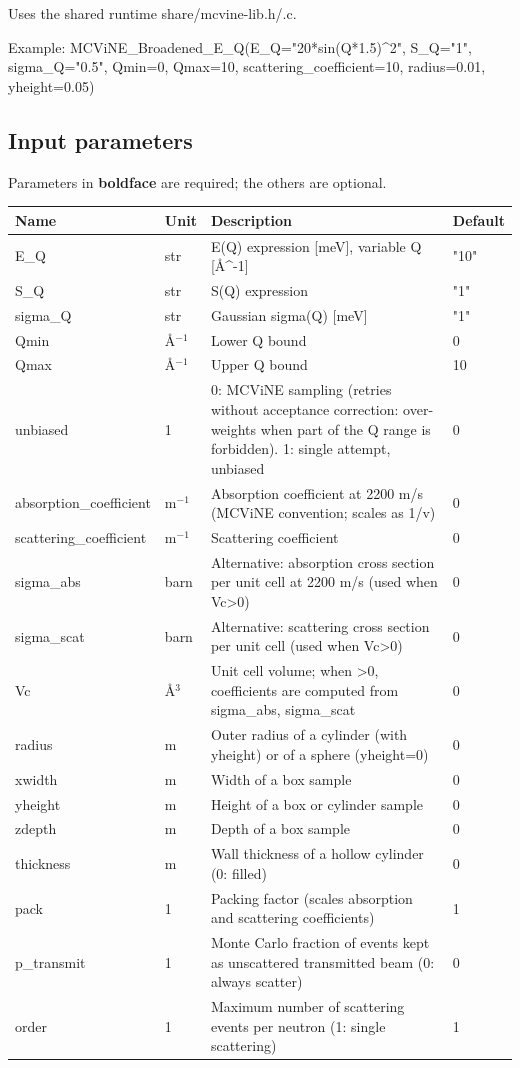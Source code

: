 Uses the shared runtime share/mcvine-lib.h/.c.

Example: MCViNE\_Broadened\_E\_Q(E\_Q="20*sin(Q*1.5)\textasciicircum{}2", S\_Q="1", sigma\_Q="0.5", Qmin=0, Qmax=10, scattering\_coefficient=10, radius=0.01, yheight=0.05)

\subsection*{Input parameters}
Parameters in \textbf{boldface} are required; the others are optional.

\begin{longtable}{p{}p{}p{}p{}}
\toprule
\textbf{Name} & \textbf{Unit} & \textbf{Description} & \textbf{Default} \\
\midrule
\endhead
E\_Q & str & E(Q) expression [meV], variable Q [\AA{}\textasciicircum{}-1] & "10" \\
S\_Q & str & S(Q) expression & "1" \\
sigma\_Q & str & Gaussian sigma(Q) [meV] & "1" \\
Qmin & \AA{}$^{-1}$ & Lower Q bound & 0 \\
Qmax & \AA{}$^{-1}$ & Upper Q bound & 10 \\
unbiased & 1 & 0: MCViNE sampling (retries without acceptance correction: over-weights when part of the Q range is forbidden). 1: single attempt, unbiased & 0 \\
absorption\_coefficient & m$^{-1}$ & Absorption coefficient at 2200 m/s (MCViNE convention; scales as 1/v) & 0 \\
scattering\_coefficient & m$^{-1}$ & Scattering coefficient & 0 \\
sigma\_abs & barn & Alternative: absorption cross section per unit cell at 2200 m/s (used when Vc\textgreater{}0) & 0 \\
sigma\_scat & barn & Alternative: scattering cross section per unit cell (used when Vc\textgreater{}0) & 0 \\
Vc & \AA{}$^{3}$ & Unit cell volume; when \textgreater{}0, coefficients are computed from sigma\_abs, sigma\_scat & 0 \\
radius & m & Outer radius of a cylinder (with yheight) or of a sphere (yheight=0) & 0 \\
xwidth & m & Width of a box sample & 0 \\
yheight & m & Height of a box or cylinder sample & 0 \\
zdepth & m & Depth of a box sample & 0 \\
thickness & m & Wall thickness of a hollow cylinder (0: filled) & 0 \\
pack & 1 & Packing factor (scales absorption and scattering coefficients) & 1 \\
p\_transmit & 1 & Monte Carlo fraction of events kept as unscattered transmitted beam (0: always scatter) & 0 \\
order & 1 & Maximum number of scattering events per neutron (1: single scattering) & 1 \\
\bottomrule
\end{longtable}

